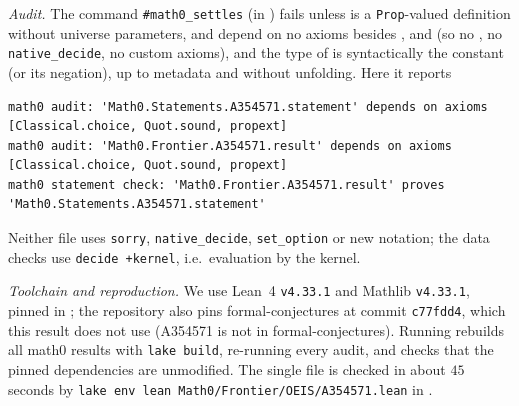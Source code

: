 \documentclass[11pt]{amsart}
\theoremstyle{plain}
\theoremstyle{definition}
\begin{document}
\emph{Audit.} The command \texttt{\#math0\_settles} (in ) fails unless  is a \texttt{Prop}-valued definition without universe parameters,  and  depend on no axioms besides ,  and  (so no , no \texttt{native\_decide}, no custom axioms), and the type of  is syntactically the constant  (or its negation), up to metadata and without unfolding. Here it reports
\begin{lstlisting}[basicstyle=\ttfamily\scriptsize]
math0 audit: 'Math0.Statements.A354571.statement' depends on axioms [Classical.choice, Quot.sound, propext]
math0 audit: 'Math0.Frontier.A354571.result' depends on axioms [Classical.choice, Quot.sound, propext]
math0 statement check: 'Math0.Frontier.A354571.result' proves 'Math0.Statements.A354571.statement'
\end{lstlisting}
Neither file uses \texttt{sorry}, \texttt{native\_decide}, \texttt{set\_option} or new notation; the data checks use \texttt{decide +kernel}, i.e.\ evaluation by the kernel.

\emph{Toolchain and reproduction.} We use Lean~4 \cite{Lean4} \texttt{v4.33.1} and Mathlib \cite{Mathlib} \texttt{v4.33.1}, pinned in ; the repository also pins formal-conjectures \cite{FC} at commit \texttt{c77fdd4}, which this result does not use (A354571 is not in formal-conjectures). Running  rebuilds all math0 results with \texttt{lake build}, re-running every audit, and checks that the pinned dependencies are unmodified. The single file is checked in about $45$ seconds by \texttt{lake env lean Math0/Frontier/OEIS/A354571.lean} in .
\end{document}
